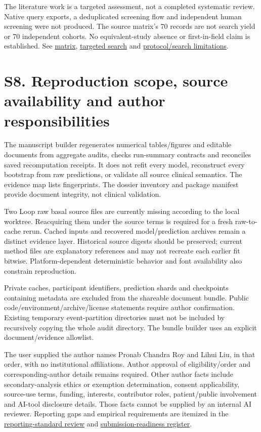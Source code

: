 \documentclass[11pt,a4paper]{article}
\begin{document}
The literature work is a targeted assessment, not a completed systematic review. Native query exports, a deduplicated screening flow and independent human screening were not produced. The source matrix's 70 records are not search yield or 70 independent cohorts. No equivalent-study absence or first-in-field claim is established. See \href{../docs/literature_matrix.csv}{matrix}, \href{../docs/targeted_prior_art_search_2026_10_31.md}{targeted search} and \href{../docs/pubmed_search_protocol_2026_10_31.md}{protocol/search limitations}.

\section*{S8. Reproduction scope, source availability and author responsibilities}
The manuscript builder regenerates numerical tables/figures and editable documents from aggregate audits, checks run-summary contracts and reconciles saved recomputation receipts. It does not refit every model, reconstruct every bootstrap from raw predictions, or validate all source clinical semantics. The evidence map lists fingerprints. The dossier inventory and package manifest provide document integrity, not clinical validation.

Two Loop raw basal source files are currently missing according to the local worktree. Reacquiring them under the source terms is required for a fresh raw-to-cache rerun. Cached inputs and recovered model/prediction archives remain a distinct evidence layer. Historical source digests should be preserved; current method files are explanatory references and may not recreate each earlier fit bitwise. Platform-dependent deterministic behavior and font availability also constrain reproduction.

Private caches, participant identifiers, prediction shards and checkpoints containing metadata are excluded from the shareable document bundle. Public code/environment/archive/license statements require author confirmation. Existing temporary event-partition directories must not be included by recursively copying the whole audit directory. The bundle builder uses an explicit document/evidence allowlist.

The user supplied the author names Pronab Chandra Roy and Lihui Liu, in that order, with no institutional affiliations. Author approval of eligibility/order and corresponding-author details remains required. Other author facts include secondary-analysis ethics or exemption determination, consent applicability, source-use terms, funding, interests, contributor roles, patient/public involvement and AI-tool disclosure details. Those facts cannot be supplied by an internal AI reviewer. Reporting gaps and empirical requirements are itemized in the \href{reviews/reporting_standards_review_2026_11_08.md}{reporting-standard review} and \href{submission_readiness_2026_11_08.md}{submission-readiness register}.
\end{document}
